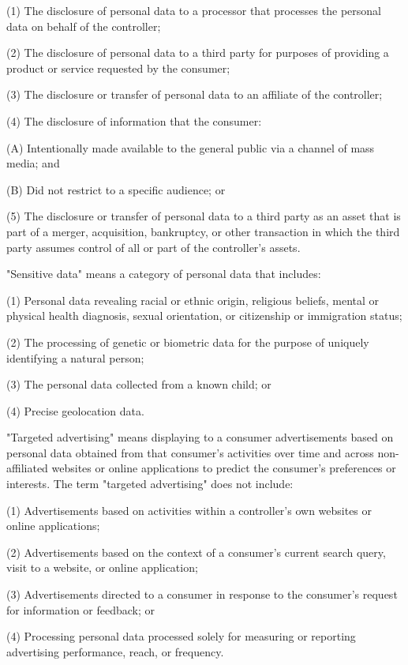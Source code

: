      (1)  The disclosure of personal data to a processor that processes the personal data on behalf of the controller;

     (2)  The disclosure of personal data to a third party for purposes of providing a product or service requested by the consumer;

     (3)  The disclosure or transfer of personal data to an affiliate of the controller;

     (4)  The disclosure of information that the consumer:

          (A)  Intentionally made available to the general public via a channel of mass media; and

          (B)  Did not restrict to a specific audience; or

     (5)  The disclosure or transfer of personal data to a third party as an asset that is part of a merger, acquisition, bankruptcy, or other transaction in which the third party assumes control of all or part of the controller's assets.

     "Sensitive data" means a category of personal data that includes:

     (1)  Personal data revealing racial or ethnic origin, religious beliefs, mental or physical health diagnosis, sexual orientation, or citizenship or immigration status;

     (2)  The processing of genetic or biometric data for the purpose of uniquely identifying a natural person;

     (3)  The personal data collected from a known child; or

     (4)  Precise geolocation data.

     "Targeted advertising" means displaying to a consumer advertisements based on personal data obtained from that consumer's activities over time and across non-affiliated websites or online applications to predict the consumer's preferences or interests.  The term "targeted advertising" does not include:

     (1)  Advertisements based on activities within a controller's own websites or online applications;

     (2)  Advertisements based on the context of a consumer's current search query, visit to a website, or online application;

     (3)  Advertisements directed to a consumer in response to the consumer's request for information or feedback; or

     (4)  Processing personal data processed solely for measuring or reporting advertising performance, reach, or frequency.

